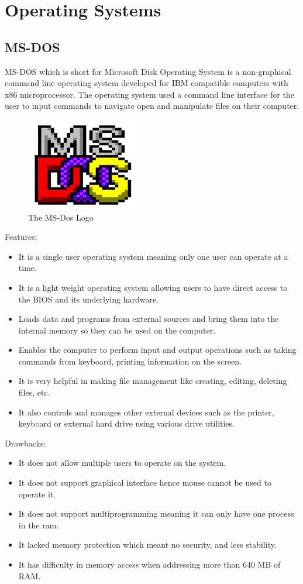 \documentclass[11pt,a4paper,twoside]{article}
\begin{document}
\section{Operating Systems}
\subsection{MS-DOS}
MS-DOS which is short for Microsoft Disk Operating System is a non-graphical command line operating system developed for IBM compatible computers with x86 microprocessor. The operating system used a command line interface for the user to input commands to navigate open and manipulate files on their computer.
\begin{figure}[H]
\centering \includegraphics[scale=1]{Fig 3.jpg}
\caption{The MS-Dos Logo}
\end{figure}
Features:
\begin{itemize}
    \item It is a single user operating system meaning only one user can operate at a time.
    \item It is a light weight operating system allowing users to have direct access to the BIOS and its underlying hardware.
    \item Loads data and programs from external sources and bring them into the internal memory so they can be used on the computer.
    \item Enables the computer to perform input and output operations such as taking commands from keyboard, printing information on the screen.
    \item It is very helpful in making file management like creating, editing, deleting files, etc.
    \item It also controls and manages other external devices such as the printer, keyboard or external hard drive using various drive utilities.
\end{itemize}
Drawbacks:
\begin{itemize}
    \item It does not allow multiple users to operate on the system.
    \item It does not support graphical interface hence mouse cannot be used to operate it.
    \item It does not support multiprogramming meaning it can only have one process in the ram.
    \item It lacked memory protection which meant no security, and less stability.
    \item It has difficulty in memory access when addressing more than 640 MB of RAM.
\end{itemize}
\end{document}
